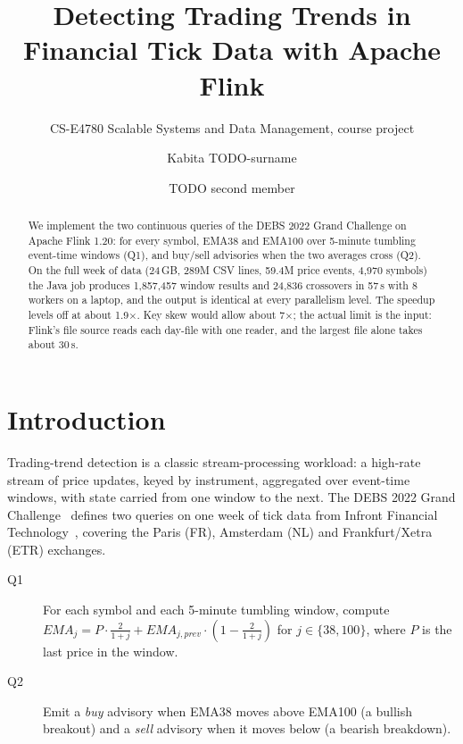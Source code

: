 \documentclass[sigconf,nonacm]{acmart}
\begin{document}
\title{Detecting Trading Trends in Financial Tick Data with Apache Flink}
\subtitle{CS-E4780 Scalable Systems and Data Management, course project}

\author{Kabita TODO-surname}
\author{TODO second member}

\begin{abstract}
We implement the two continuous queries of the DEBS 2022 Grand Challenge on
Apache Flink 1.20: for every symbol, EMA38 and EMA100 over 5-minute tumbling
event-time windows (Q1), and buy/sell advisories when the two averages cross
(Q2). On the full week of data (24\,GB, 289M CSV lines, 59.4M price events,
4,970 symbols) the Java job produces 1,857,457 window results and 24,836
crossovers in 57\,s with 8 workers on a laptop, and the output is identical at
every parallelism level. The speedup levels off at about 1.9$\times$. Key skew
would allow about 7$\times$; the actual limit is the input: Flink's file source
reads each day-file with one reader, and the largest file alone takes about
30\,s.
\end{abstract}

\maketitle

\section{Introduction}
Trading-trend detection is a classic stream-processing workload: a high-rate
stream of price updates, keyed by instrument, aggregated over event-time
windows, with state carried from one window to the next. The DEBS 2022 Grand
Challenge~\cite{debs2022} defines two queries on one week of tick data from
Infront Financial Technology~\cite{dataset}, covering the Paris (FR), Amsterdam (NL) and
Frankfurt/Xetra (ETR) exchanges.

\begin{description}
\item[Q1] For each symbol and each 5-minute tumbling window, compute
  $\mathit{EMA}_j = P\cdot\frac{2}{1+j} + \mathit{EMA}_{j,\mathit{prev}}\cdot\left(1-\frac{2}{1+j}\right)$
  for $j\in\{38,100\}$, where $P$ is the last price in the window.
\item[Q2] Emit a \emph{buy} advisory when EMA38 moves above EMA100 (a bullish
  breakout) and a \emph{sell} advisory when it moves below (a bearish breakdown).
\end{description}
\end{document}
